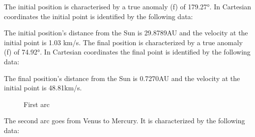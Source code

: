 \documentclass[11pt,a4paper]{report}
\begin{document}
The initial position is characterised by a true anomaly (f) of 179.27°. In Cartesian coordinates the initial point is identified by the following data:

\begin{table}[H]
\centering
{}
\end{table}

The initial position’s distance from the Sun is 29.8789AU and the velocity at the initial point is 1.03 km/s.
The final position is characterized by a true anomaly (f) of 74.92°. In Cartesian coordinates the final point is identified by the following data:

\begin{table}[H]
\centering
{}
\end{table}

The final position’s distance from the Sun is 0.7270AU and the velocity at the initial point is 48.81km/s.

\begin{figure}[H]
\centering
{}
    \caption{First arc}
\end{figure}

The second arc goes from Venus to Mercury. It is characterized by the following data:

\begin{table}[H]
\centering
{}
\end{table}
\end{document}
